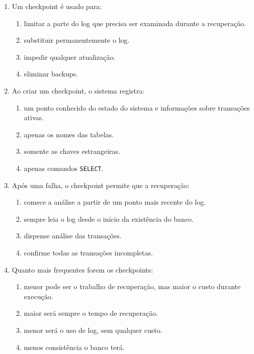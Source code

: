 \documentclass[12pt,a4paper]{article}
\begin{document}
\begin{enumerate}[label=\textbf{Q\arabic*.}]
\item Um checkpoint é usado para:

\begin{enumerate}[label=\alph*)]
    \item limitar a parte do log que precisa ser examinada durante a recuperação.
    \item substituir permanentemente o log.
    \item impedir qualquer atualização.
    \item eliminar backups.
\end{enumerate}

\item Ao criar um checkpoint, o sistema registra:

\begin{enumerate}[label=\alph*)]
    \item um ponto conhecido do estado do sistema e informações sobre transações ativas.
    \item apenas os nomes das tabelas.
    \item somente as chaves estrangeiras.
    \item apenas comandos \texttt{SELECT}.
\end{enumerate}

\item Após uma falha, o checkpoint permite que a recuperação:

\begin{enumerate}[label=\alph*)]
    \item comece a análise a partir de um ponto mais recente do log.
    \item sempre leia o log desde o início da existência do banco.
    \item dispense análise das transações.
    \item confirme todas as transações incompletas.
\end{enumerate}

\item Quanto mais frequentes forem os checkpoints:

\begin{enumerate}[label=\alph*)]
    \item menor pode ser o trabalho de recuperação, mas maior o custo durante execução.
    \item maior será sempre o tempo de recuperação.
    \item menor será o uso de log, sem qualquer custo.
    \item menos consistência o banco terá.
\end{enumerate}


\end{enumerate}
\end{document}
